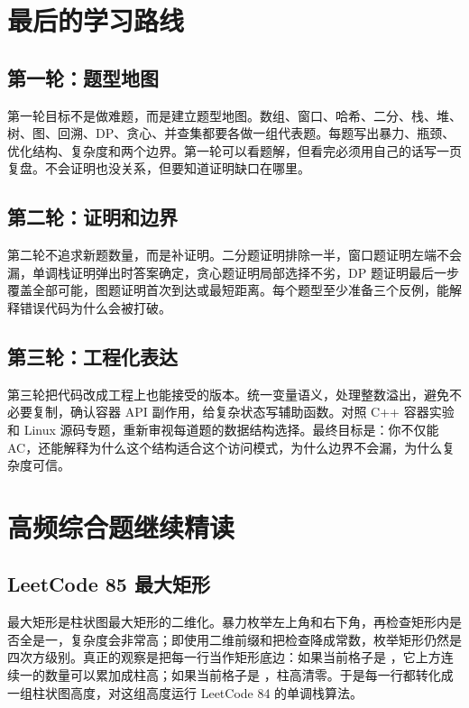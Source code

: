 \section{最后的学习路线}

\subsection{第一轮：题型地图}

第一轮目标不是做难题，而是建立题型地图。数组、窗口、哈希、二分、栈、堆、树、图、回溯、DP、贪心、并查集都要各做一组代表题。每题写出暴力、瓶颈、优化结构、复杂度和两个边界。第一轮可以看题解，但看完必须用自己的话写一页复盘。不会证明也没关系，但要知道证明缺口在哪里。

\subsection{第二轮：证明和边界}

第二轮不追求新题数量，而是补证明。二分题证明排除一半，窗口题证明左端不会漏，单调栈证明弹出时答案确定，贪心题证明局部选择不劣，DP 题证明最后一步覆盖全部可能，图题证明首次到达或最短距离。每个题型至少准备三个反例，能解释错误代码为什么会被打破。

\subsection{第三轮：工程化表达}

第三轮把代码改成工程上也能接受的版本。统一变量语义，处理整数溢出，避免不必要复制，确认容器 API 副作用，给复杂状态写辅助函数。对照 C++ 容器实验和 Linux 源码专题，重新审视每道题的数据结构选择。最终目标是：你不仅能 AC，还能解释为什么这个结构适合这个访问模式，为什么边界不会漏，为什么复杂度可信。

\section{高频综合题继续精读}

\subsection{LeetCode 85 最大矩形}

最大矩形是柱状图最大矩形的二维化。暴力枚举左上角和右下角，再检查矩形内是否全是一，复杂度会非常高；即使用二维前缀和把检查降成常数，枚举矩形仍然是四次方级别。真正的观察是把每一行当作矩形底边：如果当前格子是 ，它上方连续一的数量可以累加成柱高；如果当前格子是 ，柱高清零。于是每一行都转化成一组柱状图高度，对这组高度运行 LeetCode 84 的单调栈算法。


